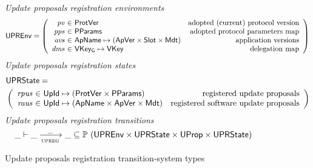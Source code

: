 \begin{figure}[htb]
  \emph{Update proposals registration  environments}
    \begin{equation*}
    \UPREnv =
    \left(
      \begin{array}{r@{~\in~}lr}
        \var{pv} & \ProtVer & \text{adopted (current) protocol version}\\
        \var{pps} & \PPMMap & \text{adopted protocol parameters map}\\
        \var{avs} & \ApName \mapsto (\ApVer \times \Slot \times \Metadata)
        & \text{application versions}\\
        \var{dms} & \VKeyGen \mapsto \VKey & \text{delegation map}\\
      \end{array}
    \right)
  \end{equation*}
  \emph{Update proposals registration states}
  \begin{align*}
    & \UPRState = \\
    & \left(
      \begin{array}{r@{~\in~}lr}
        \var{rpus} & \UPropId \mapsto (\ProtVer \times \PPMMap)
        & \text{registered update proposals}\\
        \var{raus} & \UPropId \mapsto (\ApName \times \ApVer \times \Metadata)
        & \text{registered software update proposals}
      \end{array}
    \right)
  \end{align*}
  \emph{Update proposals registration transitions}
  \begin{equation*}
    \var{\_} \vdash
    \var{\_} \trans{upreg}{\_} \var{\_}
    \subseteq \powerset (\UPREnv \times \UPRState \times \UProp \times \UPRState)
  \end{equation*}
  \caption{Update proposals registration transition-system types}
  \label{fig:ts-types:up-registration}
\end{figure}

